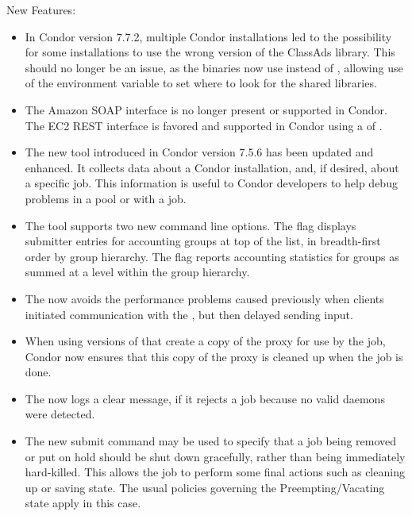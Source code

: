 \noindent New Features:

\begin{itemize}

\item In Condor version 7.7.2, multiple Condor installations led to the
possibility for some installations to use the wrong version of the ClassAds 
library.
This should no longer be an issue, 
as the binaries now use  instead of , 
allowing use of the  environment variable 
to set where to look for the shared libraries.

\item The Amazon SOAP interface is no longer present or supported in Condor.
The EC2 REST interface is favored and supported in Condor
using a  of .

\item The new  tool introduced in 
Condor version 7.5.6 has been updated and enhanced.
It collects data about a Condor installation, and, if desired, 
about a specific job. 
This information is useful to Condor developers to help 
debug problems in a pool or with a job.

\item The  tool supports two new command line options.
The  flag displays submitter entries 
for accounting groups at top of the list,
 in breadth-first order by group hierarchy.
The  flag reports accounting statistics for groups 
as summed at a level within the group hierarchy.

\item The  now avoids the performance problems caused
previously when clients initiated communication with the ,
but then delayed sending input.

\item When using versions of  that create a copy of the proxy 
for use by the job, 
Condor now ensures that this copy of the proxy is cleaned up
when the job is done.

\item The  now logs a clear message, if it rejects a job
because no valid  daemons were detected.

\item The new submit command 
may be used to specify that a job being removed or put on hold should
be shut down gracefully, rather than being immediately hard-killed.
This allows the job to perform some final actions such as cleaning
up or saving state.  The usual policies governing the Preempting/Vacating
state apply in this case.  


\end{itemize}
